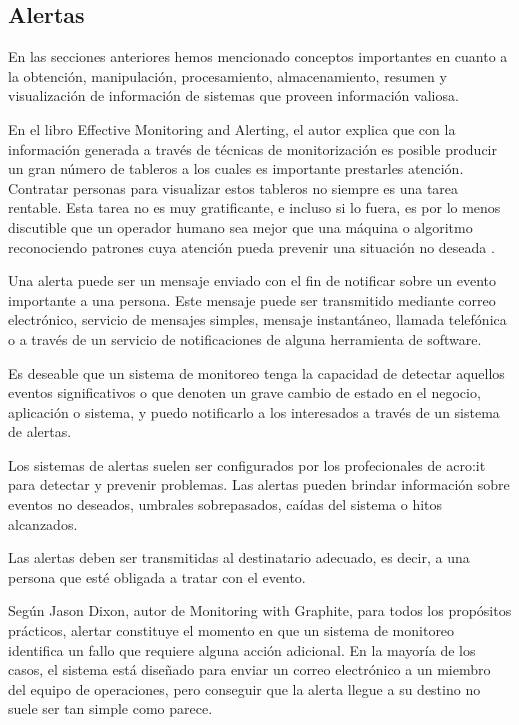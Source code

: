 \subsection{Alertas}
\label{alertas}

En las secciones anteriores hemos mencionado conceptos importantes en cuanto a
la obtención, manipulación, procesamiento, almacenamiento, resumen y
visualización de información de sistemas que proveen información valiosa.

En el libro Effective Monitoring and Alerting, el autor explica que con la
información generada a través de técnicas de monitorización es posible producir
un gran número de tableros a los cuales es importante prestarles atención.
Contratar personas para visualizar estos tableros no siempre es una tarea
rentable. Esta tarea no es muy gratificante, e incluso si lo fuera, es por lo
menos discutible que un operador humano sea mejor que una máquina o algoritmo
reconociendo patrones cuya atención pueda prevenir una situación no deseada
\cite[p. ~ 47]{monitoreo:efective_monitoring_and_alerting}.

Una alerta puede ser un mensaje enviado con el fin de notificar sobre un evento
importante a una persona. Este mensaje puede ser transmitido mediante correo
electrónico, servicio de mensajes simples, mensaje instantáneo, llamada
telefónica o a través de un servicio de notificaciones de alguna herramienta de
software.

Es deseable que un sistema de monitoreo tenga la capacidad de detectar aquellos
eventos significativos o que denoten un grave cambio de estado en el negocio,
aplicación o sistema, y puedo notificarlo a los interesados a través de un
sistema de alertas.

Los sistemas de alertas suelen ser configurados por los profecionales de
\gls{acro:it} para detectar y prevenir problemas. Las alertas pueden brindar
información sobre eventos no deseados, umbrales sobrepasados, caídas del
sistema o hitos alcanzados.

Las alertas deben ser transmitidas al destinatario adecuado, es decir, a una
persona que esté obligada a tratar con el evento.

Según Jason Dixon, autor de Monitoring with Graphite, para todos los propósitos
prácticos, alertar constituye el momento en que un sistema de monitoreo
identifica un fallo que requiere alguna acción adicional. En la mayoría de los
casos, el sistema está diseñado para enviar un correo electrónico a un miembro
del equipo de operaciones, pero conseguir que la alerta llegue a su destino no
suele ser tan simple como parece.

